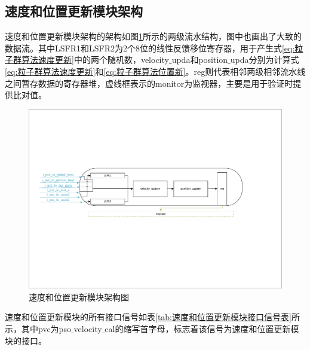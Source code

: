 \subsection{速度和位置更新模块架构}
速度和位置更新模块架构的架构如图\ref{fig:速度和位置更新模块架构图}所示的两级流水结构，图中也画出了大致的数据流。其中LSFR1和LSFR2为2个8位的线性反馈移位寄存器，用于产生式\eqref{eq:粒子群算法速度更新}中的两个随机数，velocity$\_$upda和position$\_$upda分别为计算式\eqref{eq:粒子群算法速度更新}和\eqref{eq:粒子群算法位置新}。reg则代表相邻两级相邻流水线之间暂存数据的寄存器堆，虚线框表示的monitor为监视器，主要是用于验证时提供比对值。
\begin{figure}[htb]
    \centering
    \includegraphics[width=14cm]{fig/5-fig/速度和位置更新模块架构图.pdf}
    \caption{速度和位置更新模块架构图}
    \label{fig:速度和位置更新模块架构图}
\end{figure}

速度和位置更新模块的所有接口信号如表\ref{tab:速度和位置更新模块接口信号表}所示，其中pvc为pso$\_$velocity$\_$cal的缩写首字母，标志着该信号为速度和位置更新模块的接口。

